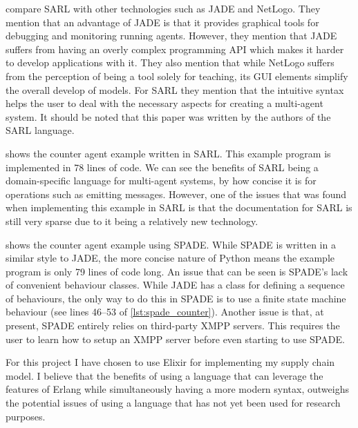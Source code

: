  compare SARL with other technologies such as JADE and NetLogo.
They mention that an advantage of JADE is that it provides graphical tools for debugging and monitoring running agents.
However, they mention that JADE suffers from having an overly complex programming API which makes it harder to develop applications with it.
They also mention that while NetLogo suffers from the perception of being a tool solely for teaching, its GUI elements simplify the overall develop of models.
For SARL they mention that the intuitive syntax helps the user to deal with the necessary aspects for creating a multi-agent system.
It should be noted that this paper was written by the authors of the SARL language.

 shows the counter agent example written in SARL\@.
This example program is implemented in 78 lines of code.
We can see the benefits of SARL being a domain-specific language for multi-agent systems, by how concise it is for operations such as emitting messages.
However, one of the issues that was found when implementing this example in SARL is that the documentation for SARL is still very sparse due to it being a relatively new technology.

 shows the counter agent example using SPADE\@.
While SPADE is written in a similar style to JADE, the more concise nature of Python means the example program is only 79 lines of code long.
An issue that can be seen is SPADE's lack of convenient behaviour classes.
While JADE has a class for defining a sequence of behaviours, the only way to do this in SPADE is to use a finite state machine behaviour (see lines 46--53 of \cref{lst:spade_counter}).
Another issue is that, at present, SPADE entirely relies on third-party XMPP servers.
This requires the user to learn how to setup an XMPP server before even starting to use SPADE\@.

For this project I have chosen to use Elixir for implementing my supply chain model.
I believe that the benefits of using a language that can leverage the features of Erlang while simultaneously having a more modern syntax, outweighs the potential issues of using a language that has not yet been used for research purposes.

